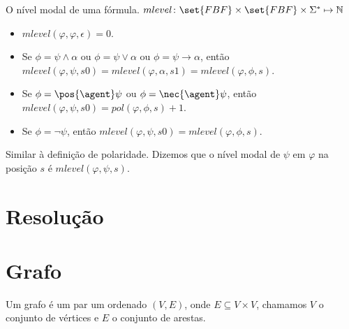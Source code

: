 \begin{definition}
O nível modal de uma fórmula. $mlevel \colon \set{FBF} \times \set{FBF} \times \Sigma^* \mapsto \mathbb{N}$

\begin{itemize}
  \item[] $mlevel(\varphi, \varphi, \epsilon) = 0$.
  \item[] Se $\phi = \psi \land \alpha$ ou $\phi = \psi \lor \alpha$ ou $\phi = \psi \rightarrow \alpha$, então $mlevel(\varphi, \psi, s0) = mlevel(\varphi, \alpha, s1) = mlevel(\varphi, \phi, s)$.
\item[] Se $\phi = \pos{\agent}\psi$ ou $\phi = \nec{\agent}\psi$, então $mlevel(\varphi, \psi, s0) = pol(\varphi, \phi, s)+1$.
  \item[] Se $\phi = \neg\psi$, então $mlevel(\varphi, \psi, s0) = mlevel(\varphi, \phi, s)$.
\end{itemize}
\end{definition}
Similar à definição de polaridade. Dizemos que o nível modal de $\psi$ em $\varphi$ na posição $s$ é $mlevel(\varphi, \psi, s)$.

\section{Resolução}


\section{Grafo}
Um grafo é um par um ordenado $(V, E)$, onde $E \subseteq V\times V$, chamamos $V$ o conjunto de vértices e $E$ o conjunto de arestas.

